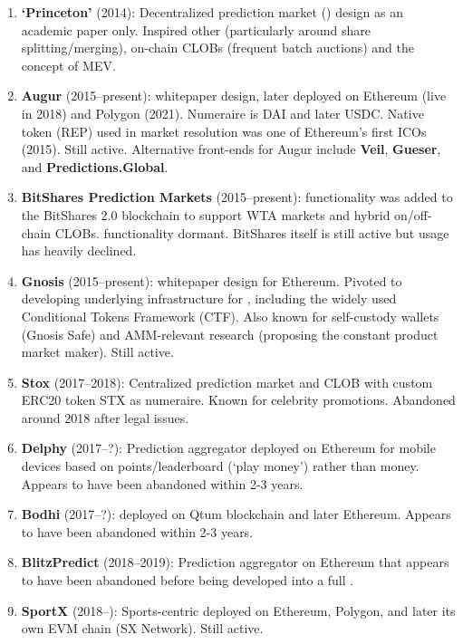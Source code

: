 \begin{enumerate}
\item \textbf{`Princeton' \depm} (2014): Decentralized prediction market (\depm) design as an academic paper only. Inspired other \depms (particularly around share splitting/merging), on-chain CLOBs (frequent batch auctions) and the concept of MEV.  

\item \textbf{Augur} (2015--present): \depm whitepaper design, later deployed on Ethereum (live in 2018) and Polygon (2021). Numeraire is DAI and later USDC. Native token (REP) used in market resolution was one of Ethereum's first ICOs (2015). Still active. Alternative front-ends for Augur include \textbf{Veil}, \textbf{Gueser}, and \textbf{Predictions.Global}.

\item \textbf{BitShares Prediction Markets} (2015--present): \depm functionality was added to the BitShares 2.0 blockchain to support WTA markets and hybrid on/off-chain CLOBs. \depm functionality dormant. BitShares itself is still active but usage has heavily declined.
 
\item \textbf{Gnosis} (2015--present): \depm whitepaper design for Ethereum. Pivoted to developing underlying infrastructure for \depms, including the widely used Conditional Tokens Framework (CTF). Also known for self-custody wallets (Gnosis Safe) and AMM-relevant research (proposing the constant product market maker). Still active. 

\item \textbf{Stox} (2017--2018): Centralized prediction market and CLOB with custom ERC20 token STX as numeraire. Known for celebrity promotions. Abandoned around 2018 after legal issues. 

\item \textbf{Delphy} (2017--?): Prediction aggregator deployed on Ethereum for mobile devices based on points/leaderboard (`play money') rather than money. Appears to have been abandoned within 2-3 years.

\item \textbf{Bodhi} (2017--?): \depm deployed on Qtum blockchain and later Ethereum. Appears to have been abandoned within 2-3 years. 

\item \textbf{BlitzPredict} (2018--2019): Prediction aggregator on Ethereum that appears to have been abandoned before being developed into a full \depm.

\item \textbf{SportX} (2018--): Sports-centric \depm deployed on Ethereum, Polygon, and later its own EVM chain (SX Network). Still active.


\end{enumerate}
